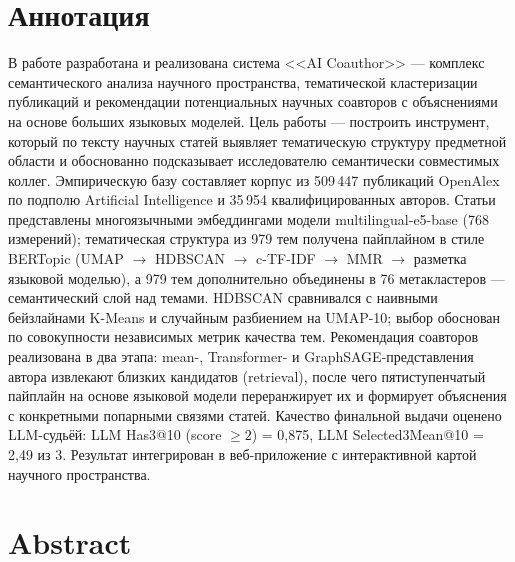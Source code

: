 \thispagestyle{empty}
\section*{Аннотация}

В работе разработана и реализована система <<AI Coauthor>> — комплекс семантического
анализа научного пространства, тематической кластеризации публикаций и рекомендации
потенциальных научных соавторов с объяснениями на основе больших языковых моделей.
Цель работы — построить инструмент, который по тексту научных статей выявляет тематическую
структуру предметной области и обоснованно подсказывает исследователю семантически
совместимых коллег. Эмпирическую базу составляет корпус из 509\,447 публикаций OpenAlex
по подполю Artificial Intelligence и 35\,954 квалифицированных авторов. Статьи представлены
многоязычными эмбеддингами модели multilingual-e5-base (768 измерений); тематическая
структура из 979 тем получена пайплайном в стиле BERTopic (UMAP $\to$ HDBSCAN $\to$
c-TF-IDF $\to$ MMR $\to$ разметка языковой моделью), а 979 тем дополнительно объединены
в 76 метакластеров — семантический слой над темами. HDBSCAN сравнивался с наивными
бейзлайнами K-Means и случайным разбиением на UMAP-10; выбор обоснован по совокупности
независимых метрик качества тем. Рекомендация соавторов реализована в два этапа:
mean-, Transformer- и GraphSAGE-представления автора извлекают близких кандидатов (retrieval),
после чего пятиступенчатый пайплайн на основе языковой модели переранжирует их и формирует
объяснения с конкретными попарными связями статей. Качество финальной выдачи оценено
LLM-судьёй: LLM Has3@10 (score $\geq 2$) = 0,875, LLM Selected3Mean@10 = 2,49 из 3.
Результат интегрирован в
веб-приложение с интерактивной картой научного пространства.

\newpage
\thispagestyle{empty}
\section*{Abstract}

